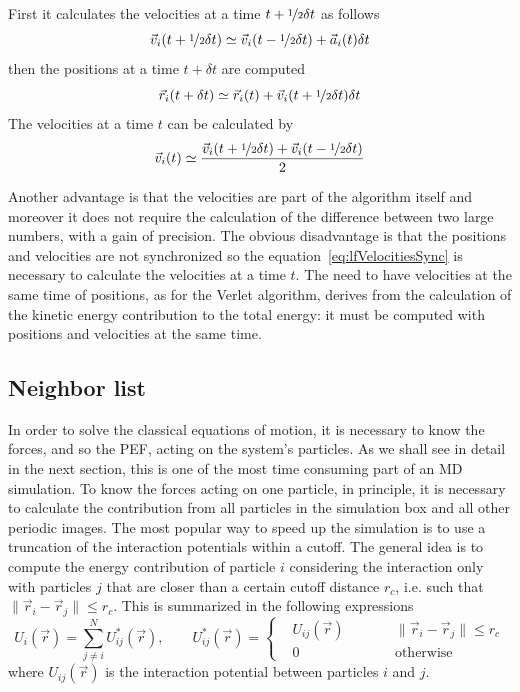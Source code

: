 First it calculates the velocities at a time $t+\nicefrac{1}{2}\delta t$ as follows
\begin{equation*}
	\vec v_i(t + \nicefrac{1}{2}\delta t) \simeq \vec v_i(t - \nicefrac{1}{2}\delta t) + \vec a_i(t)\delta t
\end{equation*}
then the positions at a time $t+\delta t$ are computed
\begin{equation*}
	\vec r_i(t + \delta t) \simeq \vec r_i(t) + \vec v_i(t + \nicefrac{1}{2}\delta t)\delta t
\end{equation*}
The velocities at a time $t$ can be calculated by
\begin{equation}
	\vec v_i(t) \simeq \frac{\vec v_i(t + \nicefrac{1}{2}\delta t) + \vec v_i(t - \nicefrac{1}{2}\delta t)}{2}
	\label{eq:lfVelocitiesSync}
\end{equation}

Another advantage is that the velocities are part of the algorithm itself and moreover it does not require the
calculation of the difference between two large numbers, with a gain of precision. The obvious disadvantage is
that the positions and velocities are not synchronized so the equation~\eqref{eq:lfVelocitiesSync} is necessary
to calculate the velocities at a time $t$. The need to have velocities at the same time of positions, as for the
Verlet algorithm, derives from the calculation of the kinetic energy contribution to the total energy: it must be
computed with positions and velocities at the same time.

\subsection{Neighbor list}
\label{sec:neighbor}
In order to solve the classical equations of motion, it is necessary to know the forces, and so the \ac{PEF},
acting on the system's particles. As we shall see in detail in the next section, this is one of the most time
consuming part of an \ac{MD} simulation. To know the forces acting on one particle, in principle, it is necessary
to calculate the contribution from all particles in the simulation box and all other periodic images. The most
popular way to speed up the simulation is to use a truncation of the interaction potentials within a cutoff. The
general idea is to compute the energy contribution of particle $i$ considering the interaction only with
particles $j$ that are closer than a certain cutoff distance $r_c$, i.e. such that
$\|\vec r_i - \vec r_j\| \le r_c$. This is summarized in the following expressions
\begin{equation*}
	U_i(\vec r) = \sum_{j\ne i}^N U^*_{ij}(\vec r), \qquad U^*_{ij}(\vec r) = \left \{
	\begin{aligned}
		& U_{ij}(\vec r)& \qquad  &\| \vec r_i - \vec r_j \| \le r_c \\
		& 0			    & \qquad  &\text{otherwise}
	\end{aligned}
	\right .
\end{equation*}
where $U_{ij}(\vec r)$ is the interaction potential between particles $i$ and $j$.

